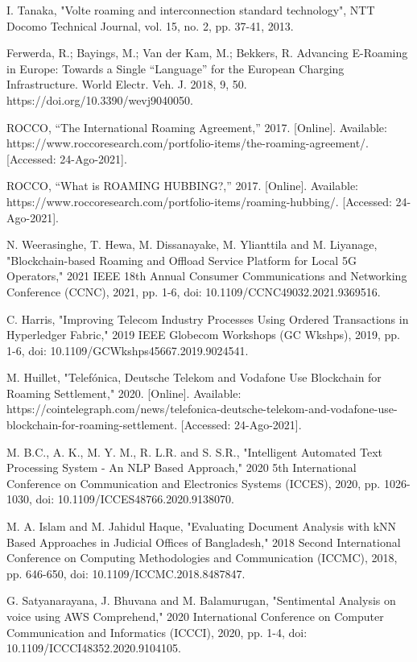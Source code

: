 \documentclass[conference]{style/IEEEtran}
\begin{document}
\begin{thebibliography}{00}

     I. Tanaka, "Volte roaming and interconnection standard technology", NTT Docomo Technical Journal, vol. 15, no. 2, pp. 37-41, 2013.

 Ferwerda, R.; Bayings, M.; Van der Kam, M.; Bekkers, R. Advancing E-Roaming in Europe: Towards a Single “Language” for the European Charging Infrastructure. World Electr. Veh. J. 2018, 9, 50. https://doi.org/10.3390/wevj9040050.

 ROCCO, “The International Roaming Agreement,” 2017. [Online]. Available: https://www.roccoresearch.com/portfolio-items/the-roaming-agreement/. [Accessed: 24-Ago-2021].

 ROCCO, “What is ROAMING HUBBING?,” 2017. [Online]. Available: https://www.roccoresearch.com/portfolio-items/roaming-hubbing/. [Accessed: 24-Ago-2021].

 N. Weerasinghe, T. Hewa, M. Dissanayake, M. Ylianttila and M. Liyanage, "Blockchain-based Roaming and Offload Service Platform for Local 5G Operators," 2021 IEEE 18th Annual Consumer Communications and Networking Conference (CCNC), 2021, pp. 1-6, doi: 10.1109/CCNC49032.2021.9369516.

 C. Harris, "Improving Telecom Industry Processes Using Ordered Transactions in Hyperledger Fabric," 2019 IEEE Globecom Workshops (GC Wkshps), 2019, pp. 1-6, doi: 10.1109/GCWkshps45667.2019.9024541.

 M. Huillet, "Telefónica, Deutsche Telekom and Vodafone Use Blockchain for Roaming Settlement," 2020. [Online]. Available: https://cointelegraph.com/news/telefonica-deutsche-telekom-and-vodafone-use-blockchain-for-roaming-settlement. [Accessed: 24-Ago-2021].

 M. B.C., A. K., M. Y. M., R. L.R. and S. S.R., "Intelligent Automated Text Processing System - An NLP Based Approach," 2020 5th International Conference on Communication and Electronics Systems (ICCES), 2020, pp. 1026-1030, doi: 10.1109/ICCES48766.2020.9138070.

 M. A. Islam and M. Jahidul Haque, "Evaluating Document Analysis with kNN Based Approaches in Judicial Offices of Bangladesh," 2018 Second International Conference on Computing Methodologies and Communication (ICCMC), 2018, pp. 646-650, doi: 10.1109/ICCMC.2018.8487847.

 G. Satyanarayana, J. Bhuvana and M. Balamurugan, "Sentimental Analysis on voice using AWS Comprehend," 2020 International Conference on Computer Communication and Informatics (ICCCI), 2020, pp. 1-4, doi: 10.1109/ICCCI48352.2020.9104105.


\end{thebibliography}
\end{document}
